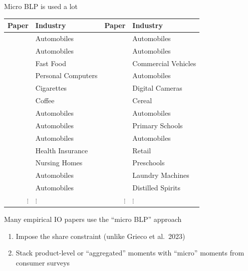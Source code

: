 \documentclass[aspectratio=169,10pt]{beamer}
\begin{document}
\begin{frame}{Micro BLP is used a lot}
    \vspace{0.5em}
    \scriptsize
    \begin{tabular}{rlrl}
        Paper & Industry & Paper & Industry \\
        \midrule
        \cite*{petrin2002quantifying} & Automobiles & \cite*{barwick2017local} & Automobiles \\
        \cite*{berry2004differentiated} & Automobiles & \cite*{murry2017advertising} & Automobiles \\
        \cite*{thomadsen2005effect} & Fast Food & \cite*{wollmann2018trucks} & Commercial Vehicles \\
        \cite*{goeree2008limited} & Personal Computers & \cite*{li2018better} & Automobiles \\
        \cite*{ciliberto2010public} & Cigarettes & \cite*{li2018empirical} & Digital Cameras \\
        \cite*{nakamura2010accounting} & Coffee & \cite*{backus2021common} & Cereal \\
        \cite*{beresteanu2011gasoline} & Automobiles & \cite*{grieco2021evolution} & Automobiles \\
        \cite*{li2012traffic} & Automobiles & \cite*{neilson2021targeted} & Primary Schools \\
        \cite*{copeland2014intertemporal} & Automobiles & \cite*{armitage2022regulatory} & Automobiles \\
        \cite*{starc2014insurer} & Health Insurance & \cite*{dopper2022rising} & Retail \\
        \cite*{ching2015quantifying} & Nursing Homes & \cite*{bodere2023dynamic} & Preschools \\
        \cite*{li2015price} & Automobiles & \cite*{montag2023mergers} & Laundry Machines \\
        \cite*{nurski2016exclusive} & Automobiles & \cite*{conlon2023market} & Distilled Spirits \\
        $\vdots$ & $\vdots$ & $\vdots$ & $\vdots$
    \end{tabular}
    \normalsize
    \vspace{0.5em}
    \begin{wideitemize}
        \item Many empirical IO papers use the ``micro BLP'' approach
        \begin{enumerate}
            \item Impose the \cite{berry1995automobile} share constraint (unlike {\color{light gray}Grieco et al.\ 2023}) \nocite{grieco2023conformant}
            \item Stack product-level or ``\alert{aggregated}'' moments with ``\alert{micro}'' moments from consumer surveys
        \end{enumerate}
    \end{wideitemize}
\end{frame}
\end{document}
